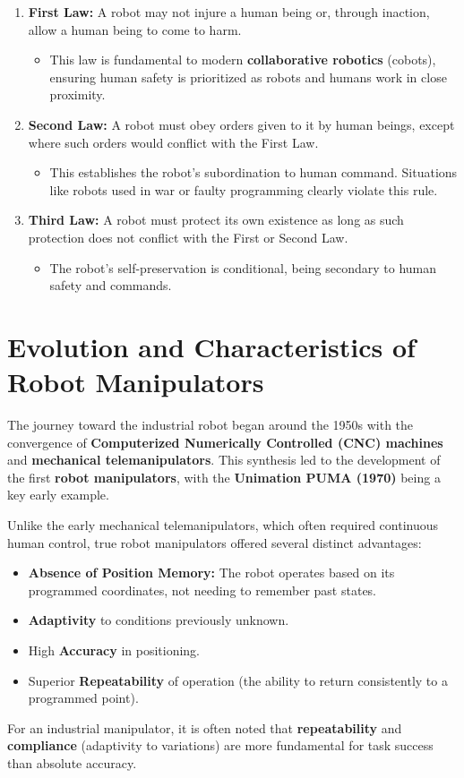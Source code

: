 \documentclass[10pt, letterpaper]{report}
\begin{document}
\begin{enumerate}
    \item \textbf{First Law:} A robot may not injure a human being or, through inaction, allow a human being to come to harm.
    \begin{itemize}
        \item This law is fundamental to modern \textbf{collaborative robotics} (cobots), ensuring human safety is prioritized as robots and humans work in close proximity.
    \end{itemize}
    \item \textbf{Second Law:} A robot must obey orders given to it by human beings, except where such orders would conflict with the First Law.
    \begin{itemize}
        \item This establishes the robot's subordination to human command. Situations like robots used in war or faulty programming clearly violate this rule.
    \end{itemize}
    \item \textbf{Third Law:} A robot must protect its own existence as long as such protection does not conflict with the First or Second Law.
    \begin{itemize}
        \item The robot's self-preservation is conditional, being secondary to human safety and commands.
    \end{itemize}
\end{enumerate}

\section{Evolution and Characteristics of Robot Manipulators}\label{gemini:ev}

The journey toward the industrial robot began around the 1950s with the convergence of \textbf{Computerized Numerically Controlled (CNC) machines} and \textbf{mechanical telemanipulators}. This synthesis led to the development of the first \textbf{robot manipulators}, with the \textbf{Unimation PUMA (1970)} being a key early example.\bigskip


Unlike the early mechanical telemanipulators, which often required continuous human control, true robot manipulators offered several distinct advantages:
\begin{itemize}
    \item \textbf{Absence of Position Memory:} The robot operates based on its programmed coordinates, not needing to remember past states.
    \item \textbf{Adaptivity} to conditions previously unknown.
    \item High \textbf{Accuracy} in positioning.
    \item Superior \textbf{Repeatability} of operation (the ability to return consistently to a programmed point).
\end{itemize}
For an industrial manipulator, it is often noted that \textbf{repeatability} and \textbf{compliance} (adaptivity to variations) are more fundamental for task success than absolute accuracy.\bigskip
\end{document}
